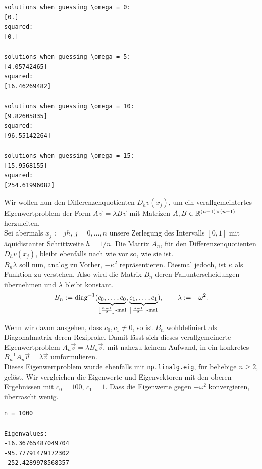 \begin{multicols}{2}
\begin{verbatim}
solutions when guessing \omega = 0:
[0.]
squared:
[0.]

solutions when guessing \omega = 5:
[4.05742465]
squared:
[16.46269482]

solutions when guessing \omega = 10:
[9.82605835]
squared:
[96.55142264]

solutions when guessing \omega = 15:
[15.9568155]
squared:
[254.61996082]
\end{verbatim}
\end{multicols}

Wir wollen nun den Differenzenquotienten $D_h v(x_j)$, um ein verallgemeintertes Eigenwertproblem der Form $A \vec v = \lambda B \vec v$ mit Matrizen $A, B \in \mathbb{R}^{(n-1) \times (n-1)}$ herzuleiten. \\

Sei abermals $x_j := jh$, $j = 0, \ldots, n$ unsere Zerlegung des Intervalls $[0, 1]$ mit äquidistanter Schrittweite $h = 1/n$. Die Matrix $A_n$, für den Differenzenquotienten $D_h v(x_j)$, bleibt ebenfalls nach wie vor so, wie sie ist. \\

$B_n \lambda$ soll nun, analog zu Vorher, $-\kappa^2$ repräsentieren. Diesmal jedoch, ist $\kappa$ als Funktion zu verstehen. Also wird die Matrix $B_n$ deren Fallunterscheidungen übernehmen und $\lambda$ bleibt konstant. \\

\begin{align*}
  B_n :=
  \text{diag}^{-1}
  (
    \underbrace{c_0, \ldots, c_0}_{{\left \lfloor \frac{n-1}{2} \right \rfloor} \text{-mal}},
    \underbrace{c_1, \ldots, c_1}_{{\left \lceil \frac{n-1}{2} \right \rceil } \text{-mal}}
  ), \qquad
  \lambda := -\omega^2.
\end{align*}

Wenn wir davon ausgehen, dass $c_0, c_1 \neq 0$, so ist $B_n$ wohldefiniert als Diagonalmatrix deren Reziproke. Damit lässt sich dieses verallgemeinerte Eigenwertproblem $A_n \vec v = \lambda B_n \vec v$, mit nahezu keinem Aufwand, in ein konkretes $B_n^{-1} A_n \vec v = \lambda \vec v$ umformulieren. \\

Dieses Eigenwertproblem wurde ebenfalls mit \verb|np.linalg.eig|, für beliebige $n \geq 2$, gelöst. Wir vergleichen die Eigenwerte und Eigenvektoren mit den oberen  Ergebnissen mit $c_0 = 100$, $c_1 = 1$. Dass die Eigenwerte gegen $-\omega^2$ konvergieren, überrascht wenig. \\

\begin{verbatim}
n = 1000
-----
Eigenvalues:
-16.36765487049704
-95.77791479172302
-252.4289978568357
\end{verbatim}
